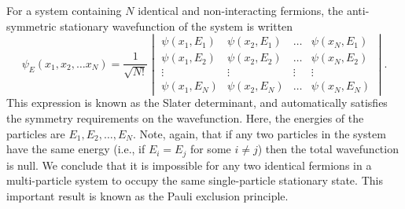 For a system containing $N$ identical and non-interacting fermions, the anti-symmetric stationary wavefunction of the system is written
\begin{equation}
	\psi_{E}(x_{1}, x_{2},\ldots x_{N}) = \frac{1}{\sqrt{N!}}
	\begin{vmatrix}
		\psi(x_{1}, E_{1}) & \psi(x_{2}, E_{1}) & \ldots & \psi(x_{N}, E_{1}) \\
		\psi(x_{1}, E_{2}) & \psi(x_{2}, E_{2}) & \ldots & \psi(x_{N}, E_{2}) \\
		\vdots & \vdots & \vdots & \vdots \\
		\psi(x_{1}, E_{N}) & \psi(x_{2}, E_{N}) & \ldots & \psi(x_{N}, E_{N})
	\end{vmatrix}.
	\label{eq:5.4.16}
\end{equation}
This expression is known as the Slater determinant, and automatically satisfies the symmetry requirements on the wavefunction. Here, the energies of the particles are $E_{1}, E_{2},\ldots, E_{N}$. Note, again, that if any two particles in the system have the same energy (i.e., if $E_{i} = E_{j}$ for some $i \neq j$) then the total wavefunction is null. We conclude that it is impossible for any two identical fermions in a multi-particle system to occupy the same single-particle stationary state. This important result is known as the Pauli exclusion principle.